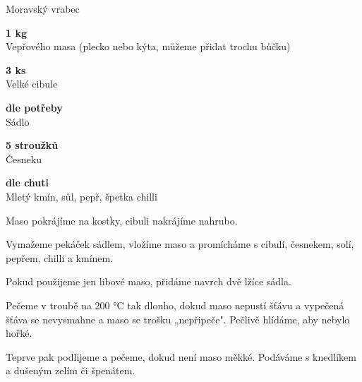 \documentclass[11pt,a4paper]{article}
\begin{document}
\begin{recipe}[FireBrick]{Moravský vrabec}
    \begin{ingredients}
        \item \parbox[t]{\linewidth}{\raggedright \weight \textbf{1 kg}\\ Vepřového masa (plecko nebo kýta, můžeme přidat trochu bůčku)}
        \item \parbox[t]{\linewidth}{\raggedright \piece \textbf{3 ks}\\ Velké cibule}
        \item \parbox[t]{\linewidth}{\raggedright \indefinite \textbf{dle potřeby}\\ Sádlo}
        \item \parbox[t]{\linewidth}{\raggedright \piece \textbf{5 stroužků}\\ Česneku}
        \item \parbox[t]{\linewidth}{\raggedright \indefinite \textbf{dle chuti}\\ Mletý kmín, sůl, pepř, špetka chilli}
    \end{ingredients}
    \begin{steps}
        \item Maso pokrájíme na kostky, cibuli nakrájíme nahrubo.
        \item Vymažeme pekáček sádlem, vložíme maso a promícháme s cibulí, česnekem, solí, pepřem, chilli a kmínem.
        \item Pokud použijeme jen libové maso, přidáme navrch dvě lžíce sádla.
        \item Pečeme v troubě na 200 °C tak dlouho, dokud maso nepustí šťávu a vypečená šťáva se nevysmahne a maso se trošku „nepřipeče". Pečlivě hlídáme, aby nebylo hořké.
        \item Teprve pak podlijeme a pečeme, dokud není maso měkké. Podáváme s knedlíkem a dušeným zelím či špenátem.
    \end{steps}
\end{recipe}
\end{document}

